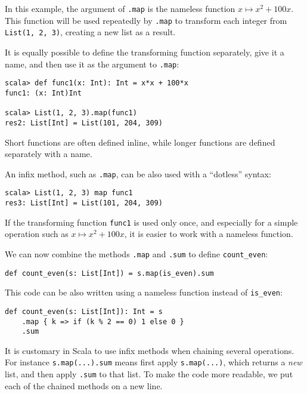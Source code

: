 In this example, the argument of \lstinline!.map! is the nameless
function $x\mapsto x^{2}+100x$. This function will be used repeatedly
by \texttt{}\lstinline!.map! to transform each integer from \lstinline!List(1, 2, 3)!,
creating a new list as a result.

It is equally possible to define the transforming function separately,
give it a name, and then use it as the argument to \lstinline!.map!:
\begin{lstlisting}
scala> def func1(x: Int): Int = x*x + 100*x
func1: (x: Int)Int 

scala> List(1, 2, 3).map(func1)
res2: List[Int] = List(101, 204, 309)
\end{lstlisting}
Short functions are often defined inline, while longer functions are
defined separately with a name.

An infix method, such as \lstinline!.map!, can be also used with
a ``dotless'' syntax:
\begin{lstlisting}
scala> List(1, 2, 3) map func1
res3: List[Int] = List(101, 204, 309)
\end{lstlisting}

If the transforming function \lstinline!func1! is used only once,
and especially for a simple operation such as $x\mapsto x^{2}+100x$,
it is easier to work with a nameless function.

We can now combine the methods \texttt{}\lstinline!.map! and \texttt{}\lstinline!.sum!
to define \lstinline!count_even!:

\begin{lstlisting}
def count_even(s: List[Int]) = s.map(is_even).sum
\end{lstlisting}

This code can be also written using a nameless function instead of
\lstinline!is_even!:

\begin{lstlisting}
def count_even(s: List[Int]): Int = s
    .map { k => if (k % 2 == 0) 1 else 0 }
    .sum
\end{lstlisting}

It is customary in Scala to use infix methods when chaining several
operations. For instance \lstinline!s.map(...).sum! means first apply
\lstinline!s.map(...)!, which returns a \emph{new} list, and then
apply \texttt{}\lstinline!.sum! to that list. To make the code more
readable, we put each of the chained methods on a new line. 

